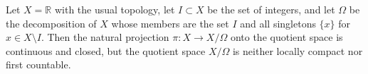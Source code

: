 Let $X = \mathbb{R}$ with the usual topology, let $I \subset X$ be the set of integers, and let $\Omega$ be the decomposition of $X$ whose members are the set $I$ and all singletons $\{x\}$ for $x \in X \setminus I$. Then the natural projection $\pi : X \to X/\Omega$ onto the quotient space is continuous and closed, but the quotient space $X/\Omega$ is neither locally compact nor first countable.
